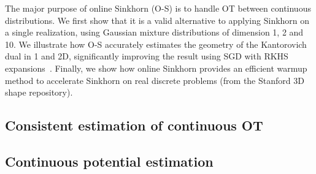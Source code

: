 The major purpose of online Sinkhorn (O-S) is to handle OT between continuous
distributions.  We first show that it is a valid alternative to applying Sinkhorn on a single realization, using Gaussian mixture distributions of dimension
1, 2 and 10. We illustrate how O-S accurately estimates the geometry of
the Kantorovich dual in 1 and 2D, significantly improving the result using SGD with RKHS
expansions~\citep{2016-genevay-nips}. Finally, we show how online Sinkhorn
provides an efficient warmup method to accelerate Sinkhorn on real discrete problems (from the Stanford 3D shape repository).


\subsection{Consistent estimation of continuous OT}\label{sec:exp1}



\subsection{Continuous potential estimation}

